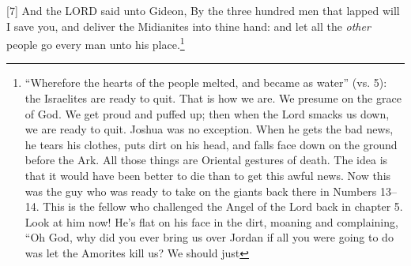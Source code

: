 [7] \textcolor[rgb]{0.00,0.00,1.00}{And the LORD said unto Gideon, By the three hundred men that lapped will I save you, and deliver the Midianites into thine hand: and let all the \emph{other} people go every man unto his place.}\footnote{“Wherefore the hearts of the people
melted, and became as water” (vs. 5): the
Israelites are ready to quit. That is how we are.
We presume on the grace of God. We get
proud and puffed up; then when the Lord
smacks us down, we are ready to quit.
Joshua was no exception. When he gets the
bad news, he tears his clothes, puts dirt on his
head, and falls face down on the ground before
the Ark. All those things are Oriental gestures
of death. The idea is that it would have been
better to die than to get this awful news.
Now this was the guy who was ready to
take on the giants back there in Numbers 13–
14. This is the fellow who challenged the Angel
of the Lord back in chapter 5. Look at him
now! He’s flat on his face in the dirt, moaning
and complaining, “Oh God, why did you ever
bring us over Jordan if all you were going to do
was let the Amorites kill us? We should just
}

